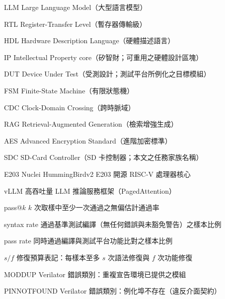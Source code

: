 
\begin{denotation}[3cm]

\item[LLM]{
  Large Language Model（大型語言模型）
}

\item[RTL]{
  Register-Transfer Level（暫存器傳輸級）
}

\item[HDL]{
  Hardware Description Language（硬體描述語言）
}

\item[IP]{
  Intellectual Property core（矽智財；可重用之硬體設計區塊）
}

\item[DUT]{
  Device Under Test（受測設計；測試平台所例化之目標模組）
}

\item[FSM]{
  Finite-State Machine（有限狀態機）
}

\item[CDC]{
  Clock-Domain Crossing（跨時脈域）
}

\item[RAG]{
  Retrieval-Augmented Generation（檢索增強生成）
}

\item[AES]{
  Advanced Encryption Standard（進階加密標準）
}

\item[SDC]{
  SD-Card Controller（SD 卡控制器；本文之任務家族名稱）
}

\item[E203]{
  Nuclei HummingBirdv2 E203 開源 RISC-V 處理器核心
}

\item[vLLM]{
  高吞吐量 LLM 推論服務框架（PagedAttention）
}

\item[pass@$k$]{
  $k$ 次取樣中至少一次通過之無偏估計通過率
}

\item[syntax rate]{
  通過基準測試編譯（無任何錯誤與未豁免警告）之樣本比例
}

\item[pass rate]{
  同時通過編譯與測試平台功能比對之樣本比例
}

\item[$s/f$]{
  修復預算表記：每樣本至多 $s$ 次語法修復與 $f$ 次功能修復
}

\item[MODDUP]{
  Verilator 錯誤類別：重複宣告環境已提供之模組
}

\item[PINNOTFOUND]{
  Verilator 錯誤類別：例化埠不存在（違反介面契約）
}

\end{denotation}
